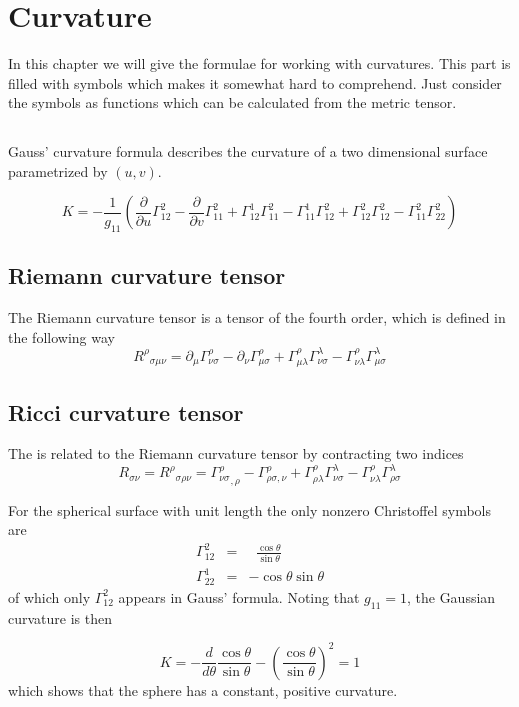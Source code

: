 \chapter{Curvature}

In this chapter we will give the formulae for working with
curvatures. This part is filled with symbols which makes it somewhat hard
to comprehend. Just consider the symbols as functions which can be
calculated from the metric tensor. 

\section{}
Gauss' curvature formula describes the curvature of a two dimensional
surface parametrized by $(u,v)$.


$$
K = -\frac{1}{g_{11}} \left( \frac{\partial}{\partial u}\Gamma_{12}^2 - \frac{\partial}{\partial v}\Gamma_{11}^2 + \Gamma_{12}^1\Gamma_{11}^2 - \Gamma_{11}^1\Gamma_{12}^2 + \Gamma_{12}^2\Gamma_{12}^2 - \Gamma_{11}^2\Gamma_{22}^2\right)
$$

\section{Riemann curvature tensor}

The Riemann curvature tensor is a tensor of the fourth order, which 
is defined in the following way
$$
{R^\rho}_{\sigma\mu\nu} = \partial_\mu\Gamma^\rho_{\nu\sigma}
    - \partial_\nu\Gamma^\rho_{\mu\sigma}
    + \Gamma^\rho_{\mu\lambda}\Gamma^\lambda_{\nu\sigma}
    - \Gamma^\rho_{\nu\lambda}\Gamma^\lambda_{\mu\sigma}
$$

\section{Ricci curvature tensor}
The  is related to the Riemann curvature 
tensor by contracting two indices
$$
   R_{\sigma\nu} = {R^\rho}_{\sigma\rho\nu} =
{\Gamma^\rho_{\nu\sigma}}_{,\rho} - \Gamma^\rho_{\rho\sigma ,\nu}
+ \Gamma^\rho_{\rho\lambda} \Gamma^\lambda_{\nu\sigma}
- \Gamma^\rho_{\nu\lambda}\Gamma^\lambda_{\rho\sigma}
$$


\myhrule
\begin{myex}
For the spherical surface with unit length the only nonzero Christoffel
symbols are
\begin{eqnarray*}
   \Gamma^2_{12} &=& \;\;\frac{\cos\theta}{\sin\theta} \\
   \Gamma^1_{22} &=& -\cos\theta\sin\theta
\end{eqnarray*}
of which only $\Gamma^2_{12}$ appears in Gauss' formula.
Noting that $g_{11}=1$, the Gaussian curvature is then

$$
    K = -\frac{d}{d\theta}\frac{\cos\theta}{\sin\theta} - \left( \frac{\cos\theta}{\sin\theta} \right)^2 = 1
$$
which shows that the sphere has a constant, positive curvature.
\end{myex}


